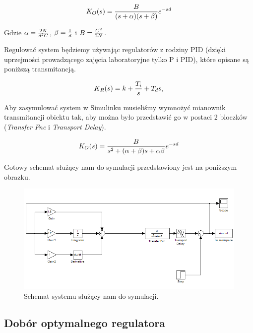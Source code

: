 \documentclass[a4paper,10pt]{article}
\begin{document}
\begin{equation} \label{eqn:transO}
	K_{O}(s)={B \over (s + \alpha) (s + \beta)}e^{-sd}
\end{equation}

Gdzie $\alpha = {2N \over d^{2}C}$, $\beta = {1 \over d}$ i $B = {C^2 \over 2N}$.

Regulować system będziemy używając regulatorów z rodziny PID (dzięki uprzejmości prowadzącego zajęcia laboratoryjne tylko P i PID), które opisane są poniższą transmitancją.

\begin{equation} \label{eqn:transR}
	K_{R}(s) = k + {T_{i} \over s} + T_{d}s ,
\end{equation}

Aby zasymulować system w Simulinku musieliśmy wymnożyć mianownik transmitancji obiektu tak, aby można było przedstawić go w postaci 2 bloczków (\textit{Transfer Fnc} i \textit{Transport Delay}).

\begin{equation} \label{eqn:transO}
	K_{O}(s)={B \over s^{2} + (\alpha + \beta)s + \alpha \beta}e^{-sd}
\end{equation}

\newpage
Gotowy schemat służący nam do symulacji przedstawiony jest na poniższym obrazku.

\begin{figure}[!h]
    \centering
	\includegraphics[width=120mm]{CW5-model-systemu.png}
	\caption{Schemat systemu służący nam do symulacji.}
    \label{fig:Rysunek}
\end{figure}

\subsection{Dobór optymalnego regulatora}
\end{document}
